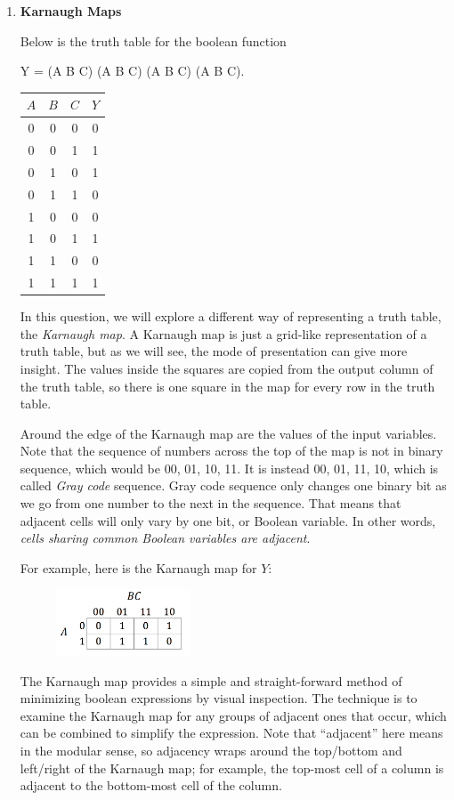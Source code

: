 \documentclass{article}\usepackage{amsmath,amssymb,amsthm,tikz,tkz-graph,color,chngpage,soul,hyperref,csquotes,graphicx,floatrow}\newcommand*{\QEDB}{\hfill\ensuremath{\square}}\newtheorem*{prop}{Proposition}\usepackage[shortlabels]{enumitem}\usepackage[nobreak=true]{mdframed}\usetikzlibrary{matrix,calc}\MakeOuterQuote{"}\usepackage[margin=1in]{geometry} \newtheorem{theorem}{Theorem} \usepackage{circuitikz}
\begin{document}
\begin{enumerate}
\item \textbf{Karnaugh Maps}

Below is the truth table for the boolean function

Y = (\lnot A \land \lnot B \land C) \lor (\lnot A \land B \land \lnot C) \lor (A \land \lnot B \land C) \lor (A \land B \land C).

%
\begin{center}
\begin{tabular}{ c | c | c || c }
$A$ & $B$ & $C$ & $Y$ \\
\hline
0 & 0 & 0 & 0 \\
0 & 0 & 1 & 1 \\
0 & 1 & 0 & 1 \\
0 & 1 & 1 & 0 \\
1 & 0 & 0 & 0 \\
1 & 0 & 1 & 1 \\
1 & 1 & 0 & 0 \\
1 & 1 & 1 & 1 
\end{tabular}
\end{center}

In this question, we will explore a different way of representing a truth table, the \emph{Karnaugh map}. A Karnaugh map is just a grid-like representation of a truth table, but as we will see, the mode of presentation can give more insight.  
The values inside the squares are copied from the output column of the truth table, so there is one square in the map for every row in the truth table. 

Around the edge of the Karnaugh map are the values of the input variables. Note that the sequence of numbers across the top of the map is not in binary sequence, which would be 00, 01, 10, 11. It is instead 00, 01, 11, 10, which is called \emph{Gray code} sequence. Gray code sequence only changes one binary bit as we go from one number to the next in the sequence. That means that adjacent cells will only vary by one bit, or Boolean variable.  In other words, \textit{cells sharing common Boolean variables are adjacent}.

For example, here is the Karnaugh map for $Y$:
%
\begin{figure}[htp]
\begin{center}
\includegraphics[width=4cm]{kmap1}
\end{center}
\end{figure}
%
The Karnaugh map provides a simple and straight-forward method of minimizing boolean expressions by visual inspection.  The technique is to examine the Karnaugh map for any groups of adjacent ones that occur, which can be combined to simplify the expression. Note that ``adjacent'' here means in the modular sense, so adjacency wraps around the top/bottom and left/right of the Karnaugh map; for example, the top-most cell of a column is adjacent to the bottom-most cell of the column.


\end{enumerate}
\end{document}
